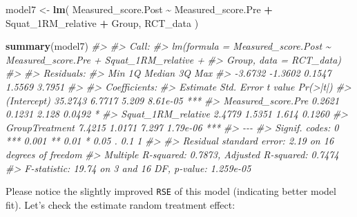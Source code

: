\documentclass[
]{book}
\newenvironment{Shaded}{\begin{snugshade}}{\end{snugshade}}
\newcommand{\CommentTok}[1]{\textcolor[rgb]{0.56,0.35,0.01}{\textit{#1}}}
\newcommand{\KeywordTok}[1]{\textcolor[rgb]{0.13,0.29,0.53}{\textbf{#1}}}
\newcommand{\NormalTok}[1]{#1}
\newcommand{\OperatorTok}[1]{\textcolor[rgb]{0.81,0.36,0.00}{\textbf{#1}}}
\newcommand{\StringTok}[1]{\textcolor[rgb]{0.31,0.60,0.02}{#1}}
\begin{document}
\begin{Shaded}
\begin{Highlighting}[]
\NormalTok{model7 <{-}}\StringTok{ }\KeywordTok{lm}\NormalTok{(}
\NormalTok{  Measured\_score.Post }\OperatorTok{\textasciitilde{}}\StringTok{ }\NormalTok{Measured\_score.Pre }\OperatorTok{+}\StringTok{ }\NormalTok{Squat\_1RM\_relative }\OperatorTok{+}\StringTok{ }\NormalTok{Group,}
\NormalTok{  RCT\_data}
\NormalTok{)}

\KeywordTok{summary}\NormalTok{(model7)}
\CommentTok{\#> }
\CommentTok{\#> Call:}
\CommentTok{\#> lm(formula = Measured\_score.Post \textasciitilde{} Measured\_score.Pre + Squat\_1RM\_relative + }
\CommentTok{\#>     Group, data = RCT\_data)}
\CommentTok{\#> }
\CommentTok{\#> Residuals:}
\CommentTok{\#>     Min      1Q  Median      3Q     Max }
\CommentTok{\#> {-}3.6732 {-}1.3602  0.1547  1.5569  3.7951 }
\CommentTok{\#> }
\CommentTok{\#> Coefficients:}
\CommentTok{\#>                    Estimate Std. Error t value Pr(>|t|)    }
\CommentTok{\#> (Intercept)         35.2743     6.7717   5.209 8.61e{-}05 ***}
\CommentTok{\#> Measured\_score.Pre   0.2621     0.1231   2.128   0.0492 *  }
\CommentTok{\#> Squat\_1RM\_relative   2.4779     1.5351   1.614   0.1260    }
\CommentTok{\#> GroupTreatment       7.4215     1.0171   7.297 1.79e{-}06 ***}
\CommentTok{\#> {-}{-}{-}}
\CommentTok{\#> Signif. codes:  0 \textquotesingle{}***\textquotesingle{} 0.001 \textquotesingle{}**\textquotesingle{} 0.01 \textquotesingle{}*\textquotesingle{} 0.05 \textquotesingle{}.\textquotesingle{} 0.1 \textquotesingle{} \textquotesingle{} 1}
\CommentTok{\#> }
\CommentTok{\#> Residual standard error: 2.19 on 16 degrees of freedom}
\CommentTok{\#> Multiple R{-}squared:  0.7873,	Adjusted R{-}squared:  0.7474 }
\CommentTok{\#> F{-}statistic: 19.74 on 3 and 16 DF,  p{-}value: 1.259e{-}05}
\end{Highlighting}
\end{Shaded}

Please notice the slightly improved \texttt{RSE} of this model (indicating better model fit). Let's check the estimate random treatment effect:
\end{document}
